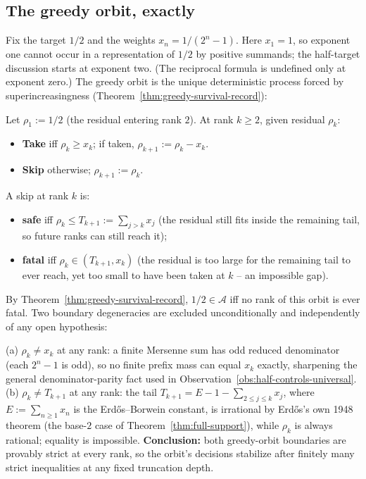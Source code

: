 \subsection{The greedy orbit, exactly}
\label{ssec:greedy-orbit}

Fix the target $1/2$ and the weights $x_n = 1/(2^n-1)$. Here $x_1=1$, so exponent one cannot occur
in a representation of $1/2$ by positive summands; the half-target discussion starts at exponent
two. (The reciprocal formula is undefined only at exponent zero.) The greedy
orbit is the unique deterministic process forced by superincreasingness
(Theorem~\ref{thm:greedy-survival-record}):

\begin{defn}
\label{defn:greedy-orbit}
Let $\rho_1 := 1/2$ (the residual entering rank $2$). At rank $k \ge 2$, given residual $\rho_k$:
\begin{itemize}[nosep]
\item \textbf{Take} iff $\rho_k \ge x_k$; if taken, $\rho_{k+1} := \rho_k - x_k$.
\item \textbf{Skip} otherwise; $\rho_{k+1} := \rho_k$.
\end{itemize}
A skip at rank $k$ is:
\begin{itemize}[nosep]
\item \textbf{safe} iff $\rho_k \le T_{k+1} := \sum_{j>k} x_j$ (the residual still fits inside the
remaining tail, so future ranks can still reach it);
\item \textbf{fatal} iff $\rho_k \in (T_{k+1}, x_k)$ (the residual is too large for the remaining
tail to ever reach, yet too small to have been taken at $k$ -- an impossible gap).
\end{itemize}
\end{defn}

By Theorem~\ref{thm:greedy-survival-record}, $1/2 \in \mathcal{A}$ iff no rank of this orbit is ever fatal.
Two boundary degeneracies are excluded unconditionally and independently of any open hypothesis:

\begin{rem}
\label{rem:no-ties}
(a) $\rho_k \ne x_k$ at any rank: a finite Mersenne sum has odd reduced denominator (each $2^n-1$ is
odd), so no finite prefix mass can equal $x_k$ exactly, sharpening the general
denominator-parity fact used in Observation~\ref{obs:half-controls-universal}.
(b) $\rho_k \ne T_{k+1}$ at any rank: the tail $T_{k+1} = E - 1 - \sum_{2 \le j \le k} x_j$, where
$E := \sum_{n\ge1} x_n$ is the Erd\H{o}s--Borwein constant, is irrational by Erd\H{o}s's own 1948
theorem (the base-$2$ case of Theorem~\ref{thm:full-support}), while $\rho_k$ is always rational;
equality is impossible. \textbf{Conclusion:} both greedy-orbit boundaries are provably strict at
every rank, so the orbit's decisions stabilize after finitely many strict inequalities at any fixed
truncation depth.   
\end{rem}

